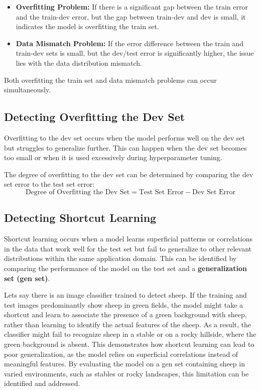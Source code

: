 \documentclass[12pt,openany]{book}
\begin{document}
\begin{itemize}
    \item \textbf{Overfitting Problem:} If there is a significant gap between the train error and the train-dev error, but the gap between train-dev and dev is small, it indicates the model is overfitting the train set. 
    \item \textbf{Data Mismatch Problem:} If the error difference between the train and train-dev sets is small, but the dev/test error is significantly higher, the issue lies with the data distribution mismatch.
\end{itemize}

\begin{notebox}
Both overfitting the train set and data mismatch problems can occur simultaneously.
\end{notebox}


\subsection{Detecting Overfitting the Dev Set}

Overfitting to the dev set occurs when the model performs well on the dev set but struggles to generalize further. This can happen when the dev set becomes too small or when it is used excessively during hyperparameter tuning. \newline

The degree of overfitting to the dev set can be determined by comparing the dev set error to the test set error:
\[
\text{Degree of Overfitting the Dev Set} = \text{Test Set Error} - \text{Dev Set Error}
\]


\subsection{Detecting Shortcut Learning} \label{subsec:detecting-shortcut-learning}

Shortcut learning occurs when a model learns superficial patterns or correlations in the data that work well for the test set but fail to generalize to other relevant distributions within the same application domain. This can be identified by comparing the performance of the model on the test set and a \textbf{generalization set (gen set)}. \newline

\begin{examplebox}
Lets say there is an image classifier trained to detect sheep. If the training and test images predominantly show sheep in green fields, the model might take a shortcut and learn to associate the presence of a green background with sheep, rather than learning to identify the actual features of the sheep. As a result, the classifier might fail to recognize sheep in a stable or on a rocky hillside, where the green background is absent. This demonstrates how shortcut learning can lead to poor generalization, as the model relies on superficial correlations instead of meaningful features. By evaluating the model on a gen set containing sheep in varied environments, such as stables or rocky landscapes, this limitation can be identified and addressed. 
\end{examplebox}
\end{document}
